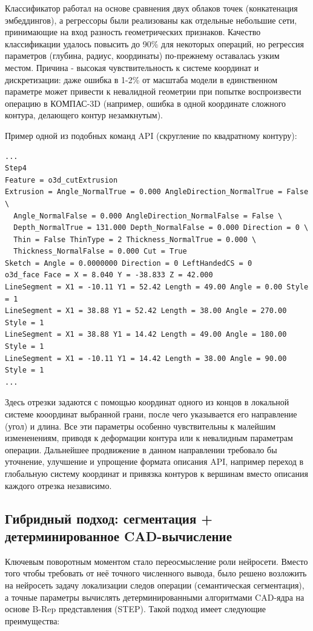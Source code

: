 Классификатор работал на основе сравнения двух облаков точек (конкатенация эмбеддингов), а регрессоры были реализованы как отдельные небольшие сети, принимающие на вход разность геометрических признаков. Качество классификации удалось повысить до 90\% для некоторых операций, но регрессия параметров (глубина, радиус, координаты) по-прежнему оставалась узким местом. Причина - высокая чувствительность к системе координат и дискретизации: даже ошибка в 1-2\% от масштаба модели в единственном параметре может привести к невалидной геометрии при попытке воспроизвести операцию в КОМПАС-3D (например, ошибка в одной координате сложного контура, делающего контур незамкнутым).

Пример одной из подобных команд API (скругление по квадратному контуру):

{
\small
\begin{lstlisting}
...
Step4 
Feature = o3d_cutExtrusion 
Extrusion = Angle_NormalTrue = 0.000 AngleDirection_NormalTrue = False \
  Angle_NormalFalse = 0.000 AngleDirection_NormalFalse = False \
  Depth_NormalTrue = 131.000 Depth_NormalFalse = 0.000 Direction = 0 \
  Thin = False ThinType = 2 Thickness_NormalTrue = 0.000 \
  Thickness_NormalFalse = 0.000 Cut = True 
Sketch = Angle = 0.0000000 Direction = 0 LeftHandedCS = 0 
o3d_face Face = X = 8.040 Y = -38.833 Z = 42.000 
LineSegment = X1 = -10.11 Y1 = 52.42 Length = 49.00 Angle = 0.00 Style = 1 
LineSegment = X1 = 38.88 Y1 = 52.42 Length = 38.00 Angle = 270.00 Style = 1 
LineSegment = X1 = 38.88 Y1 = 14.42 Length = 49.00 Angle = 180.00 Style = 1 
LineSegment = X1 = -10.11 Y1 = 14.42 Length = 38.00 Angle = 90.00 Style = 1 
...
\end{lstlisting}
}
Здесь отрезки задаются с помощью координат одного из концов в локальной системе кооординат выбранной грани, после чего указывается его направление (угол) и длина. Все эти параметры особенно чувствительны к малейшим измененениям, приводя к деформации контура или к невалидным параметрам операции. Дальнейшее продвижение в данном направлении требовало бы уточнение, улучшение и упрощение формата описания API, например переход в глобальную систему координат и привязка контуров к вершинам вместо описания каждого отрезка независимо.

\subsection{Гибридный подход: сегментация + детерминированное CAD-вычисление}
Ключевым поворотным моментом стало переосмысление роли нейросети. Вместо того чтобы требовать от неё точного численного вывода, было решено возложить на нейросеть задачу локализации следов операции (семантическая сегментация), а точные параметры вычислять детерминированными алгоритмами CAD-ядра на основе B-Rep представления (STEP). Такой подход имеет следующие преимущества:

